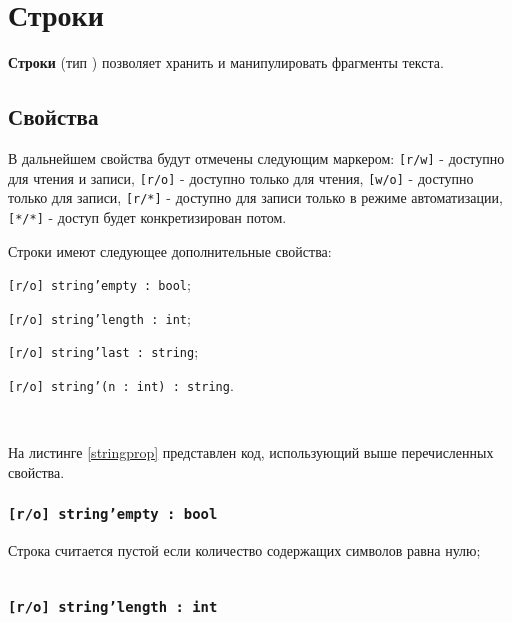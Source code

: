 \section{Строки}

{\bf Строки} (тип \str{}) позволяет хранить и манипулировать фрагменты текста. 

\subsection{Свойства}

В дальнейшем свойства будут отмечены следующим маркером: \texttt{[r/w]} - доступно для чтения и записи, \texttt{[r/o]} - доступно только для чтения, \texttt{[w/o]} - доступно только для записи,  \texttt{[r/*]} - доступно для записи только в режиме автоматизации, \texttt{[*/*]} - доступ будет конкретизирован потом.

Строки имеют следующее дополнительные свойства:
\begin{icItems}
\item
	\texttt{[r/o] string'empty : bool};
\item
	\texttt{[r/o] string'length : int};
\item
	\texttt{[r/o] string'last : string};
\item
    \texttt{[r/o] string'(n : int) : string}.
\end{icItems}

\

На листинге \ref{stringprop} представлен код, использующий выше перечисленных свойства.

\subsubsection{\texttt{[r/o] string'empty : bool}}

Строка считается пустой если количество содержащих символов равна нулю;

\begin{sourcecode}
    \label{stringprop}
    \inputminted[linenos]{icl}{../sources/stringprop.icL}
\end{sourcecode}

\subsubsection{\texttt{[r/o] string'length : int}}

